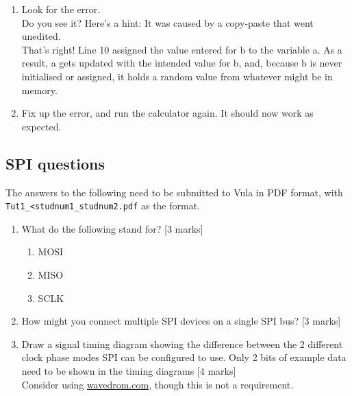 \begin{enumerate}
\begin{enumerate}
    \end{enumerate}
    \item Look for the error.\\
    Do you see it? Here's a hint: It was caused by a copy-paste that went unedited.\\
    That's right! Line 10 assigned the value entered for b to the variable a. As a result, a gets updated with the intended value for b, and, because b is never initialised or assigned, it holds a random value from whatever might be in memory.
    \item Fix up the error, and run the calculator again. It should now work as expected.
\end{enumerate}

\subsection{SPI questions}
The answers to the following need to be submitted to Vula in PDF format, with \verb|Tut1_<studnum1_studnum2.pdf| as the format.

\begin{enumerate}
    \item What do the following stand for? [3 marks]
    \begin{enumerate}
        \item MOSI %
        \item MISO %
        \item SCLK %
    \end{enumerate}
    \item How might you connect multiple SPI devices on a single SPI bus? [3 marks]
    \item Draw a signal timing diagram showing the difference between the 2 different clock phase modes SPI can be configured to use. Only 2 bits of example data need to be shown in the timing diagrams [4 marks]\\
    Consider using \href{https://wavedrom.com/}{wavedrom.com}, though this is not a requirement.
\end{enumerate}